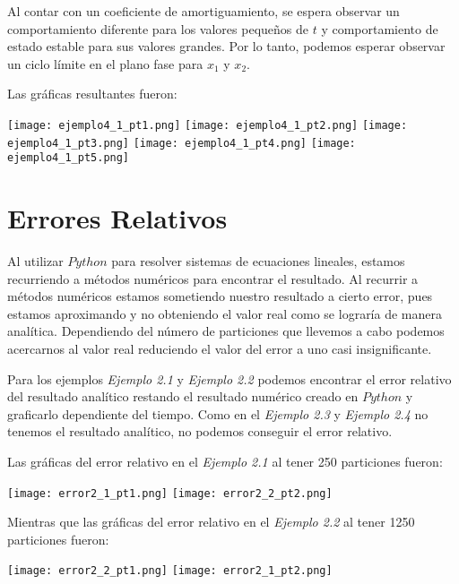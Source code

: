 \documentclass{article}
\begin{document}
Al contar con un coeficiente de amortiguamiento, se espera observar un comportamiento diferente para los valores pequeños de $t$ y comportamiento de estado estable para sus valores grandes. Por lo tanto, podemos esperar observar un ciclo límite en el plano fase para $x_1$ y $x_2$.

Las gráficas resultantes fueron:

\begin{center}
\texttt{[image: ejemplo4\_1\_pt1.png]}
\texttt{[image: ejemplo4\_1\_pt2.png]}
\texttt{[image: ejemplo4\_1\_pt3.png]}
\texttt{[image: ejemplo4\_1\_pt4.png]}
\texttt{[image: ejemplo4\_1\_pt5.png]}
\end{center}

\section{Errores Relativos}
Al utilizar $Python$ para resolver sistemas de ecuaciones lineales, estamos recurriendo a métodos numéricos para encontrar el resultado. Al recurrir a métodos numéricos estamos sometiendo nuestro resultado a cierto error, pues estamos aproximando y no obteniendo el valor real como se lograría de manera analítica. Dependiendo del número de particiones que llevemos a cabo podemos acercarnos al valor real reduciendo el valor del error a uno casi insignificante.

Para los ejemplos \textit{Ejemplo 2.1} y \textit{Ejemplo 2.2} podemos encontrar el error relativo del resultado analítico restando el resultado numérico creado en $Python$ y graficarlo dependiente del tiempo. Como en  el \textit{Ejemplo 2.3} y \textit{Ejemplo 2.4} no tenemos el resultado analítico, no podemos conseguir el error relativo.

Las gráficas del error relativo en el \textit{Ejemplo 2.1} al tener 250 particiones fueron:

\begin{center}
\texttt{[image: error2\_1\_pt1.png]}
\texttt{[image: error2\_2\_pt2.png]}
\end{center}

Mientras que las gráficas del error relativo en el \textit{Ejemplo 2.2} al tener 1250 particiones fueron:

\begin{center}
\texttt{[image: error2\_2\_pt1.png]}
\texttt{[image: error2\_1\_pt2.png]}
\end{center}
\end{document}
